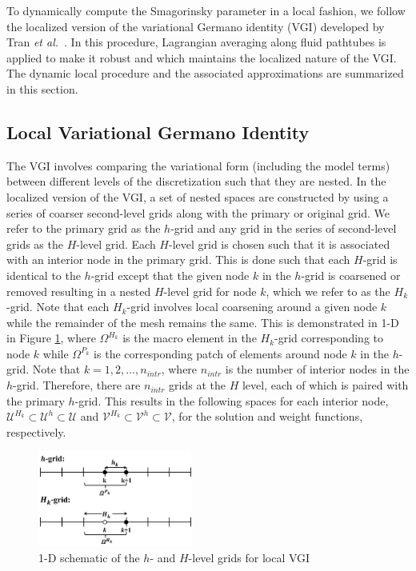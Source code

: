 To dynamically compute the Smagorinsky
parameter in a local fashion, we follow the localized version of
the variational Germano identity (VGI) developed by
Tran \textit{et al.}~\cite{bib:tran2017b}.
In this procedure, Lagrangian averaging along fluid pathtubes is applied to make it robust and which maintains the localized nature of the VGI.
The dynamic local procedure and the associated approximations are summarized in this section.

\subsection{Local Variational Germano Identity}
\label{sec:VGI}

The VGI involves comparing the variational form (including the model terms)
between different levels of the discretization such that they are nested.
In the localized version of the VGI, a set of nested spaces are constructed
by using a series of coarser second-level grids
along with the primary or original grid.
We refer to the primary grid as the $h$-grid and any grid in the
series of second-level grids as the $H$-level grid.
Each $H$-level grid is chosen such that it is associated with an
interior node in the primary grid.
This is done such that each $H$-grid is identical to
the $h$-grid except that the given node $k$ in the $h$-grid is coarsened or
removed resulting in a nested $H$-level grid for node $k$, which we refer to
as the $H_k$-grid.
Note that
each $H_k$-grid involves local coarsening around a given node $k$ while the remainder of the mesh remains the same.
This is
demonstrated in 1-D in Figure \ref{fig:vgi_grid},
where $\Omega^{H_k}$ is
the macro element in the $H_k$-grid corresponding to node
$k$ while $\Omega^{P_k}$ is the corresponding patch of elements
around node $k$ in the $h$-grid.
Note that $k = 1, 2, \ldots, n_{intr}$, where $n_{intr}$ is the number
of interior nodes in the $h$-grid. Therefore, there are $n_{intr}$
grids at the $H$ level, each of which is paired with the primary $h$-grid.
This results in the following spaces for each interior node,
$\bm{\mathcal{U}}^{H_k} \subset \bm{\mathcal{U}}^h \subset \bm{\mathcal{U}}$
and
$\bm{\mathcal{V}}^{H_k} \subset \bm{\mathcal{V}}^h \subset \bm{\mathcal{V}}$,
for the solution and weight functions, respectively.

\begin{figure}[H]
\centering
\includegraphics[width=0.45\textwidth]{figures/Setup/localization_grid.pdf}
\caption{1-D schematic of the $h$- and $H$-level grids for local VGI}
\label{fig:vgi_grid}
\end{figure}


